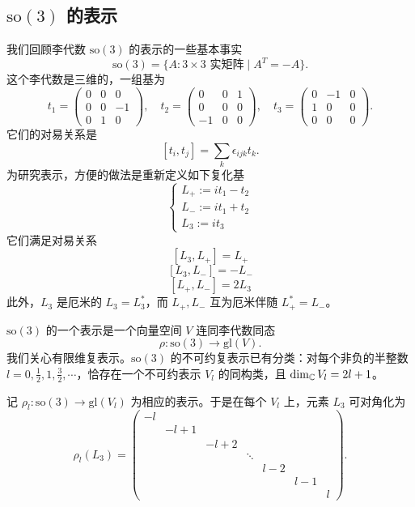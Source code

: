\subsection{\texorpdfstring{\(\mathrm{so}(3)\)}{so(3)} 的表示}

我们回顾李代数 \(\mathrm{so}(3)\) 的表示的一些基本事实
\[
  \mathrm{so}(3)=\{A:3\times3 \text{ 实矩阵}\mid A^T=-A\}.
\]
这个李代数是三维的，一组基为
\[
  t_1=\begin{pmatrix}0&0&0\\ 0&0&-1\\ 0&1&0\end{pmatrix},\quad
  t_2=\begin{pmatrix}0&0&1\\ 0&0&0\\ -1&0&0\end{pmatrix},\quad
  t_3=\begin{pmatrix}0&-1&0\\ 1&0&0\\ 0&0&0\end{pmatrix}.
\]
它们的对易关系是
\[
  [t_i,t_j]=\sum_k\epsilon_{ijk}t_k.
\]
为研究表示，方便的做法是重新定义如下复化基
\[
  \begin{cases}
    L_+:=it_1-t_2\\
    L_-:=it_1+t_2\\
    L_3:=it_3
  \end{cases}
\]
它们满足对易关系
\[
  [L_3,L_+]=L_+
\]
\[
  [L_3,L_-]=-L_-
\]
\[
  [L_+,L_-]=2L_3
\]
此外，\(L_3\) 是厄米的 \(L_3=L_3^*\)，而 \(L_+,L_-\) 互为厄米伴随 \(L_+^*=L_-\)。

\(\mathrm{so}(3)\) 的一个表示是一个向量空间 \(V\) 连同李代数同态
\[
  \rho:\mathrm{so}(3)\longrightarrow \mathrm{gl}(V).
\]
我们关心有限维复表示。\(\mathrm{so}(3)\) 的不可约复表示已有分类：对每个非负的半整数 \(l=0,\frac{1}{2},1,\frac{3}{2},\cdots\)，恰存在一个不可约表示 \(V_l\) 的同构类，且 \(\dim_{\mathbb{C}} V_l=2l+1\)。

记 \(\rho_l:\mathrm{so}(3)\to\mathrm{gl}(V_l)\) 为相应的表示。于是在每个 \(V_l\) 上，元素 \(L_3\) 可对角化为
\[
  \rho_l(L_3)=
  \begin{pmatrix}
    -l & & & & & & \\
     & -l+1 & & & & & \\
     & & -l+2 & & & & \\
     & & & \ddots & & & \\
     & & & & l-2 & & \\
     & & & & & l-1 & \\
     & & & & & & l
  \end{pmatrix}.
\]


